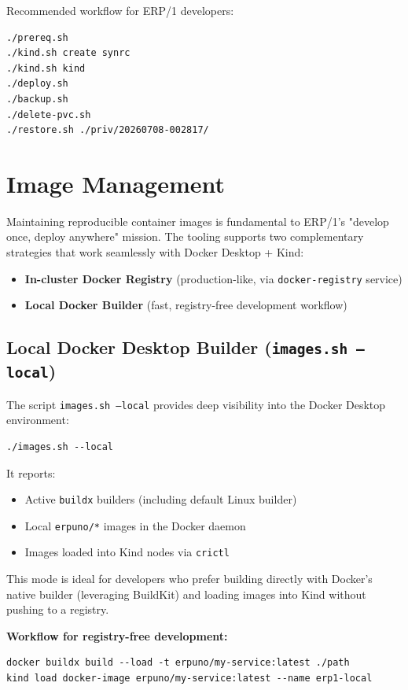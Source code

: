 \documentclass{article}
\begin{document}
Recommended workflow for ERP/1 developers:

\begin{verbatim}
./prereq.sh
./kind.sh create synrc
./kind.sh kind
./deploy.sh
./backup.sh
./delete-pvc.sh
./restore.sh ./priv/20260708-002817/
\end{verbatim}

\newpage
\section{Image Management}

Maintaining reproducible container images is fundamental to ERP/1's "develop once,
deploy anywhere" mission. The tooling supports two complementary strategies
that work seamlessly with Docker Desktop + Kind:

\begin{itemize}
\item \textbf{In-cluster Docker Registry} (production-like, via \texttt{docker-registry} service)
\item \textbf{Local Docker Builder} (fast, registry-free development workflow)
\end{itemize}

\subsection{Local Docker Desktop Builder (\texttt{images.sh --local})}

The script \texttt{images.sh --local} provides deep visibility into the Docker Desktop environment:

\begin{verbatim}
./images.sh --local
\end{verbatim}

It reports:
\begin{itemize}
\item Active \texttt{buildx} builders (including default Linux builder)
\item Local \texttt{erpuno/*} images in the Docker daemon
\item Images loaded into Kind nodes via \texttt{crictl}
\end{itemize}

This mode is ideal for developers who prefer building directly with Docker's native
builder (leveraging BuildKit) and loading images into Kind without pushing to a registry.

\textbf{Workflow for registry-free development:}
\begin{verbatim}
docker buildx build --load -t erpuno/my-service:latest ./path
kind load docker-image erpuno/my-service:latest --name erp1-local
\end{verbatim}
\end{document}
